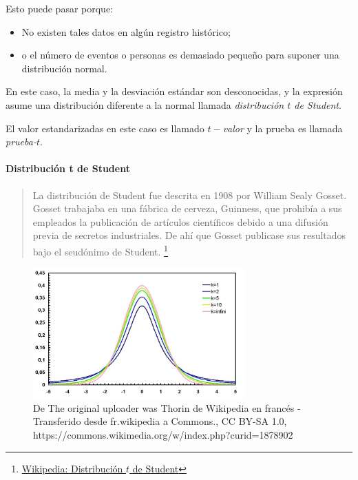 Esto puede pasar porque:
\begin{itemize}
	\item No existen tales datos en algún registro histórico;
	\item o el número de eventos o personas es demasiado pequeño para suponer una distribución normal.
\end{itemize}


En este caso, la media y la desviación estándar son desconocidas, y la expresión asume una distribución diferente a la normal llamada \emph{distribución $t$ de Student}.



El valor estandarizadas en este caso es llamado \emph{$t-$valor} y la prueba es llamada \emph{prueba-$t$}.


\paragraph{Distribución t de Student}
\begin{quote}
	La distribución de Student fue descrita en 1908 por William Sealy Gosset. Gosset trabajaba en una fábrica de cerveza, Guinness, que prohibía a sus empleados la publicación de artículos científicos debido a una difusión previa de secretos industriales. De ahí que Gosset publicase sus resultados bajo el seudónimo de Student. \footnote{
		\href{https://es.wikipedia.org/wiki/Distribuci\%C3\%B3n\_t\_de\_Student\#Historia}{Wikipedia: Distribución $t$ de Student}
	}
\end{quote}


\begin{figure}
	\centering
	\includegraphics[height=5cm,keepaspectratio=true]{./images/Student_densite_best.jpg}
	\caption{De The original uploader was Thorin de Wikipedia en francés - Transferido desde fr.wikipedia a Commons., CC BY-SA 1.0, https://commons.wikimedia.org/w/index.php?curid=1878902}
	\label{fig:tPDF}
\end{figure}




